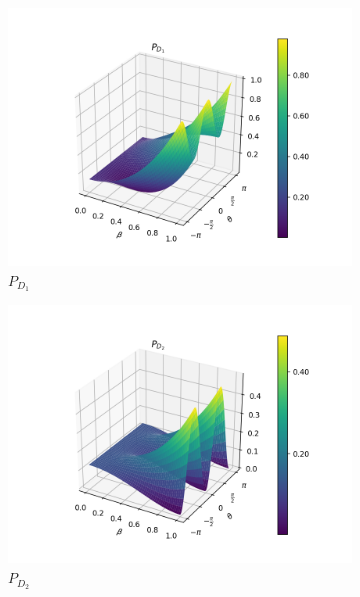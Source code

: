 \documentclass{book}
\begin{document}
\begin{figure}[H]
\centering
\begin{subfigure}[b]{0.30\linewidth}
\includegraphics[width=\linewidth]{images/pd1_3_pi4.png}
\caption{$P_{D_{1}}$}
\end{subfigure}
\begin{subfigure}[b]{0.30\linewidth}
\includegraphics[width=\linewidth]{images/pd2_3_pi4.png}
\caption{$P_{D_{2}}$ }
\label{fig:BS1}
\end{subfigure}
\begin{subfigure}[b]{0.30\linewidth}

\end{subfigure}
\end{figure}
\end{document}
